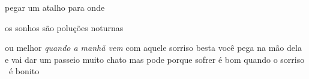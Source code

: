 \begin{poem}
\begin{stanza}
\qquad pegar\verseline
\qquad \qquad um\verseline
\qquad \qquad \qquad atalho\verseline
\qquad para onde
\end{stanza}
\begin{stanza}
\qquad \qquad os sonhos\verseline
\qquad são poluções noturnas
\end{stanza}
\begin{stanza}
\qquad \qquad ou melhor\verseline
\textit{quando a manhã vem} com aquele\verseline
\qquad sorriso besta\verseline
\qquad \qquad você\verseline
\qquad \quad pega na mão dela\verseline
\qquad e vai\verseline
\qquad \qquad dar um passeio muito chato\verseline
\qquad \qquad \quad mas pode\verseline
\qquad porque sofrer é bom\verseline
\qquad \quad quando o sorriso\verseline
\qquad \qquad \, é bonito
\end{stanza}
\end{poem}